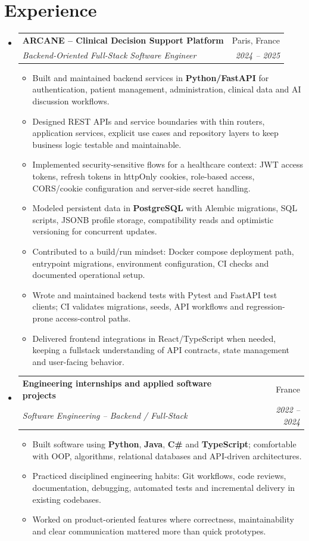 \documentclass[letterpaper,11pt]{article}
\makeatletter
\newcommand{\resumeItem}[1]{\item\small{#1 \vspace{-2pt}}}
\newcommand{\resumeSubheading}[4]{
  \vspace{-2pt}\item
    \begin{tabular*}{0.97\textwidth}[t]{l@{\extracolsep{\fill}}r}
      \textbf{#1} & #2 \\
      \textit{\small#3} & \textit{\small #4} \\
    \end{tabular*}\vspace{-7pt}
}
\newcommand{\resumeSubHeadingListStart}{\begin{itemize}[leftmargin=0.15in, label={}]}
\newcommand{\resumeSubHeadingListEnd}{\end{itemize}}
\newcommand{\resumeItemListStart}{\begin{itemize}[leftmargin=0.18in]}
\newcommand{\resumeItemListEnd}{\end{itemize}\vspace{-5pt}}
\makeatother
\begin{document}
\section{Experience}
\resumeSubHeadingListStart
  \resumeSubheading
    {ARCANE -- Clinical Decision Support Platform}{Paris, France}
    {Backend-Oriented Full-Stack Software Engineer}{2024 -- 2025}
    \resumeItemListStart
      \resumeItem{Built and maintained backend services in \textbf{Python/FastAPI} for authentication, patient management, administration, clinical data and AI discussion workflows.}
      \resumeItem{Designed REST APIs and service boundaries with thin routers, application services, explicit use cases and repository layers to keep business logic testable and maintainable.}
      \resumeItem{Implemented security-sensitive flows for a healthcare context: JWT access tokens, refresh tokens in httpOnly cookies, role-based access, CORS/cookie configuration and server-side secret handling.}
      \resumeItem{Modeled persistent data in \textbf{PostgreSQL} with Alembic migrations, SQL scripts, JSONB profile storage, compatibility reads and optimistic versioning for concurrent updates.}
      \resumeItem{Contributed to a build/run mindset: Docker compose deployment path, entrypoint migrations, environment configuration, CI checks and documented operational setup.}
      \resumeItem{Wrote and maintained backend tests with Pytest and FastAPI test clients; CI validates migrations, seeds, API workflows and regression-prone access-control paths.}
      \resumeItem{Delivered frontend integrations in React/TypeScript when needed, keeping a fullstack understanding of API contracts, state management and user-facing behavior.}
    \resumeItemListEnd

  \resumeSubheading
    {Engineering internships and applied software projects}{France}
    {Software Engineering -- Backend / Full-Stack}{2022 -- 2024}
    \resumeItemListStart
      \resumeItem{Built software using \textbf{Python}, \textbf{Java}, \textbf{C\#} and \textbf{TypeScript}; comfortable with OOP, algorithms, relational databases and API-driven architectures.}
      \resumeItem{Practiced disciplined engineering habits: Git workflows, code reviews, documentation, debugging, automated tests and incremental delivery in existing codebases.}
      \resumeItem{Worked on product-oriented features where correctness, maintainability and clear communication mattered more than quick prototypes.}
    \resumeItemListEnd
\resumeSubHeadingListEnd
\end{document}
